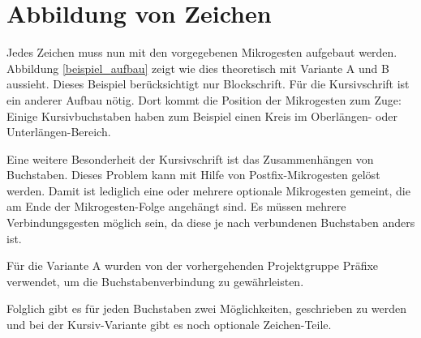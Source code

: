 \section{Abbildung von Zeichen}
Jedes Zeichen muss nun mit den vorgegebenen Mikrogesten aufgebaut werden. Abbildung \ref{beispiel_aufbau} zeigt wie dies theoretisch mit Variante A und B aussieht. Dieses Beispiel berücksichtigt nur Blockschrift. Für die Kursivschrift ist ein anderer Aufbau nötig. Dort kommt die Position der Mikrogesten zum Zuge: Einige Kursivbuchstaben haben zum Beispiel einen Kreis im Oberlängen- oder Unterlängen-Bereich.

Eine weitere Besonderheit der Kursivschrift ist das Zusammenhängen von Buchstaben. Dieses Problem kann mit Hilfe von Postfix-Mikrogesten gelöst werden. Damit ist lediglich eine oder mehrere optionale Mikrogesten gemeint, die am Ende der Mikrogesten-Folge angehängt sind. Es müssen mehrere Verbindungsgesten möglich sein, da diese je nach verbundenen Buchstaben anders ist.

Für die Variante A wurden von der vorhergehenden Projektgruppe Präfixe verwendet, um die Buchstabenverbindung zu gewährleisten.

Folglich gibt es für jeden Buchstaben zwei Möglichkeiten, geschrieben zu werden und bei der Kursiv-Variante gibt es noch optionale Zeichen-Teile. 

